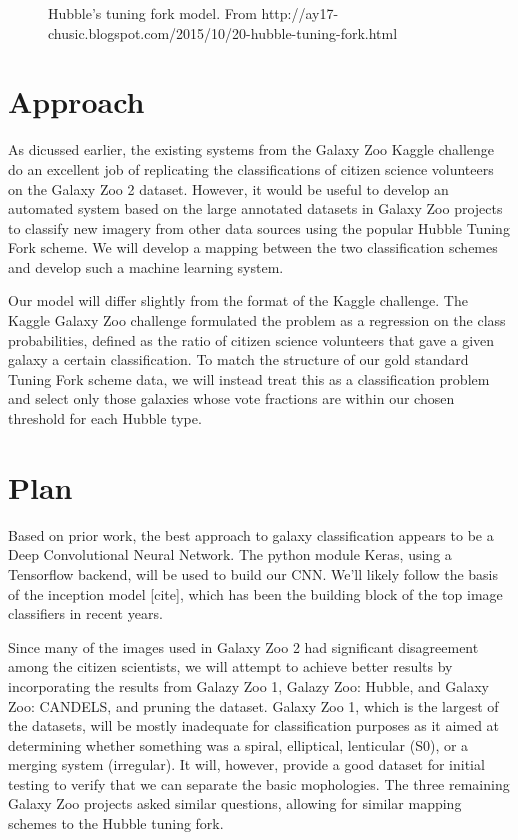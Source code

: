 \documentclass[twocolumn]{aastex6}
\begin{document}
\cite{2015MNRAS.450.1441D}

\begin{figure}[!t]
\caption{Hubble's tuning fork model. From http://ay17-chusic.blogspot.com/2015/10/20-hubble-tuning-fork.html}
\label{fig:tuningFork}
\end{figure}


\section{Approach}
As dicussed earlier, the existing systems from the Galaxy Zoo Kaggle challenge do an excellent job of replicating the classifications of citizen science volunteers on the Galaxy Zoo 2 dataset. However, it would be useful to develop an automated system based on the large annotated datasets in Galaxy Zoo projects to classify new imagery from other data sources using the popular Hubble Tuning Fork scheme. We will develop a mapping between the two classification schemes and develop such a machine learning system. 

Our model will differ slightly from the format of the Kaggle challenge. The Kaggle Galaxy Zoo challenge formulated the problem as a regression on the class probabilities, defined as the ratio of citizen science volunteers that gave a given galaxy a certain classification. To match the structure of our gold standard Tuning Fork scheme data, we will instead treat this as a classification problem and select only those galaxies whose vote fractions are within our chosen threshold for each Hubble type.


\section{Plan}
Based on prior work, the best approach to galaxy classification appears to be a Deep Convolutional Neural Network. The python module Keras, using a Tensorflow backend, will be used to build our CNN. We'll likely follow the basis of the inception model [cite], which has been the building block of the top image classifiers in recent years.

Since many of the images used in Galaxy Zoo 2 had significant disagreement among the citizen scientists, we will attempt to achieve better results by incorporating the results from Galazy Zoo 1, Galazy Zoo: Hubble, and Galaxy Zoo: CANDELS, and pruning the dataset. Galaxy Zoo 1, which is the largest of the datasets, will be mostly inadequate for classification purposes as it aimed at determining whether something was a spiral, elliptical, lenticular (S0), or a merging system (irregular). It will, however, provide a good dataset for initial testing to verify that we can separate the basic mophologies. The three remaining Galaxy Zoo projects asked similar questions, allowing for similar mapping schemes to the Hubble tuning fork.
\end{document}
